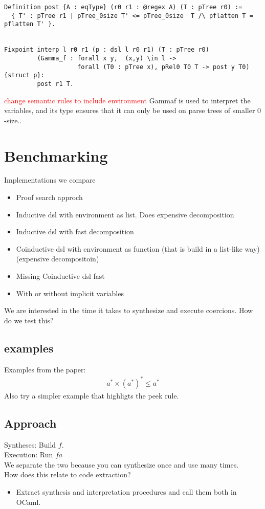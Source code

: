 \documentclass[a4paper,UKenglish,cleveref, autoref, thm-restate]{lipics-v2021}
\newcommand\mycomment[1]{\textcolor{red}{#1}}
\begin{document}
\begin{verbatim}
Definition post {A : eqType} (r0 r1 : @regex A) (T : pTree r0) := 
  { T' : pTree r1 | pTree_0size T' <= pTree_0size  T /\ pflatten T = pflatten T' }. 


Fixpoint interp l r0 r1 (p : dsl l r0 r1) (T : pTree r0) 
         (Gamma_f : forall x y,  (x,y) \in l -> 
                    forall (T0 : pTree x), pRel0 T0 T -> post y T0) {struct p}:
         post r1 T. 
\end{verbatim}
\mycomment{change semantic rules to include environment}
\textsf{Gammaf} is used to interpret the variables, and its type ensures that it can only be used on parse trees of smaller $0$-size..
\section{Benchmarking}
Implementations we compare
\begin{itemize}
\item Proof search approch
\item Inductive dsl with environment as list. Does expensive decomposition
\item Inductive dsl with fast decomposition
\item Coinductive dsl with environment as function (that is build in a list-like way) (expensive decompositoin)
\item Missing Coinductive dsl fast
\item With or without implicit variables
\end{itemize}

We are interested in the time it takes to synthesize and execute coercions. How do we test this?\\
\subsection{examples}
Examples from the paper:\\
\begin{align}
a ^* \times (a^*)^* \leq a^*
\end{align}
Also try a simpler example that highligts the peek rule. 
\subsection{Approach}
Syntheses: Build $f$.\\
Execution: Run $f a$\\
We separate the two because you can synthesize once and use many times.\\
How does this relate to code extraction?
\begin{itemize}
\item Extract synthesis and interpretation procedures and call them both in OCaml. 
\end{itemize}
\end{document}
